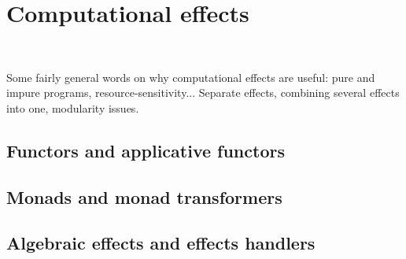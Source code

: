 \chapter{Computational effects}
~\label{cpt-effects}

  Some fairly general words on why computational effects are useful: pure and impure programs, resource-sensitivity... Separate effects, combining several effects into one, modularity issues.

  \section{Functors and applicative functors}

  \section{Monads and monad transformers}

  \section{Algebraic effects and effects handlers}